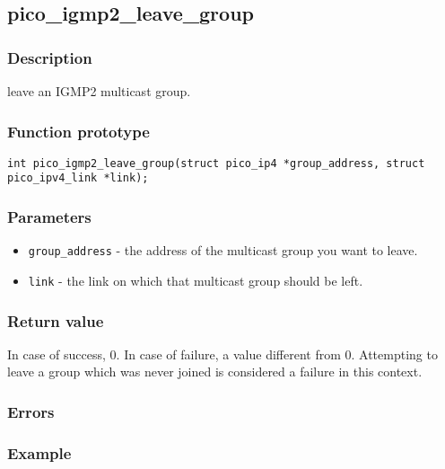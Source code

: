 \subsection{pico\_igmp2\_leave\_group}

\subsubsection*{Description}
leave an IGMP2 multicast group.

\subsubsection*{Function prototype}
\texttt{int pico\_igmp2\_leave\_group(struct pico\_ip4 *group\_address, struct pico\_ipv4\_link *link);}

\subsubsection*{Parameters}
\begin{itemize}
\item \texttt{group\_address} - the address of the multicast group you want to leave.
\item \texttt{link} - the link on which that multicast group should be left.
\end{itemize}

\subsubsection*{Return value}
In case of success, 0. In case of failure, a value different from 0. Attempting to leave a group which was never joined is considered a failure in this context. 

\subsubsection*{Errors}

\subsubsection*{Example}



